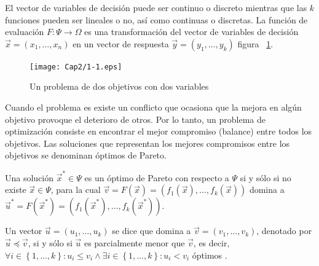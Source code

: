       El vector de variables de decisi\'on puede ser continuo o discreto mientras que las $k$ funciones pueden ser 
      lineales o no, as\'i como continuas o discretas. La funci\'on de evaluaci\'on $F:\Psi \rightarrow \Omega$ es una transformaci\'on 
      del vector de variables de decisi\'on $\vec{x} = \left(x_1 , \ldots, x_n \right)$ en un vector de respuesta 
      $\vec{y} = \left(y_1 , \ldots, y_k \right)$ \DIFdelbegin {}\DIFdelend \DIFaddbegin {}\DIFaddend figura ~\ref{fig:multiobj}\DIFdelbegin {}\DIFdelend \DIFaddbegin \DIFadd{)}\DIFaddend .

      \begin{figure}
	\centering
	\DIFdelbeginFL %
\DIFdelendFL \DIFaddbeginFL \texttt{[image: Cap2/1-1.eps]}
	  \DIFaddendFL \caption{Un problema de dos objetivos con dos variables}
      \label{fig:multiobj}
      \end{figure}

      Cuando el problema es \DIFdelbegin {}\DIFdelend \DIFaddbegin {}\DIFaddend existe un conflicto que ocasiona que la mejora en alg\'un objetivo provoque 
      el deterioro de otros. Por lo tanto, un problema de optimizaci\'on \DIFdelbegin {}\DIFdelend \DIFaddbegin {}\DIFaddend consiste en encontrar el mejor 
      compromiso (balance) entre todos los objetivos. Las soluciones que representan los mejores compromisos entre los 
      objetivos se denominan \'optimos de Pareto.  

      \begin{definicion}
	  Una soluci\'on $\vec{x}^*\in \Psi$ es un \'optimo de Pareto con respecto a $\Psi$ si y s\'olo si no existe 
	  $\vec{x}\in \Psi$, para la cual $\vec{v} = F\left(\vec{x}\right)=\left(f_1\left(\vec{x}\right), \ldots,f_k\left(\vec{x}\right) \right)$ 
	  domina a $\vec{u}^*=F\left(\vec{x}^*\right)=\left(f_1\left(\vec{x}^*\right), \ldots,f_k\left(\vec{x}^*\right) \right)$.
      \end{definicion}

      \begin{definicion}
	  Un vector $\vec{u} = \left(u_1, \ldots, u_k \right)$ se dice que domina a $\vec{v} = \left(v_1, \ldots, v_k \right)$,
	  denotado por $\vec{u} \preceq \vec{v}$, si y s\'olo si $\vec{u}$ es parcialmente menor que $\vec{v}$, es decir, 
	  $\forall i \in \left\{1, \ldots, k \right\}: u_i \leq v_i \wedge \exists i \in \left\{1, \ldots, k\right\}: u_i < v_i$
	  \DIFaddbegin {}\'optimos \DIFaddend .
      \end{definicion}

